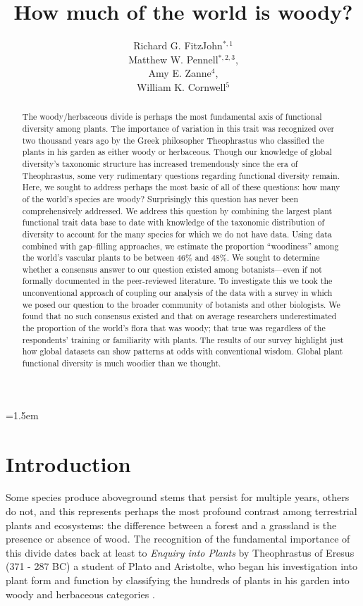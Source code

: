 \documentclass[12pt]{article}
\title{How much of the world is woody?}
\author{
Richard G. FitzJohn$^{*,1}$\\ Matthew W. Pennell$^{*,2,3}$,\\ Amy E. Zanne$^{4}$,\\ William K. Cornwell$^{5}$
}
\date{}
\affiliation{\noindent
$^*$ These authors contributed equally}
\begin{document}
\mstitlepage
\parindent=1.5em
\addtolength{\parskip}{.3em}

\begin{abstract}
The woody/herbaceous divide is perhaps the most fundamental axis of functional diversity among plants. The importance of variation in this trait was recognized over two thousand years ago by the Greek philosopher Theophrastus who classified the plants in his garden as either woody or herbaceous. Though our knowledge of global diversity's taxonomic structure  has increased tremendously since the era of Theophrastus, some very rudimentary questions regarding functional diversity remain. Here, we sought to address perhaps the most basic of all of these questions: how many of the world's species are woody? Surprisingly this question has never been comprehensively addressed.  We address this question by combining the largest plant functional trait data base to date with knowledge of the taxonomic distribution of diversity to account for the many species for which we do not have data. Using data combined with gap--filling approaches, we estimate the proportion ``woodiness'' among the world's vascular plants to be between 46\% and 48\%.  We sought to determine whether a consensus answer to our question existed among botanists---even if not formally documented in the peer-reviewed literature. To investigate this we took the unconventional approach of coupling our analysis of the data with a survey in which we posed our question to the broader community of botanists and other biologists.  We found that no such consensus existed and that on average researchers underestimated the proportion of the world's flora that was woody; that true was regardless of the respondents' training or familiarity with plants. The results of our survey highlight just how global datasets can show patterns at odds with conventional wisdom.  Global plant functional diversity is much woodier than we thought.  
\end{abstract}

\section{Introduction}

Some species produce aboveground stems that persist for multiple years, others do not, and this represents perhaps the most profound contrast among terrestrial plants and ecosystems: the difference between a forest and a grassland is the presence or absence of wood. The recognition of the fundamental importance of this divide dates back at least to \textit{Enquiry into Plants} by Theophrastus of Eresus (371 - 287 BC) a student of Plato and Aristolte, who began his investigation into plant form and function by classifying the hundreds of plants in his garden into woody and herbaceous categories \citep{theophrastus1916enquiry}.  
\end{document}
